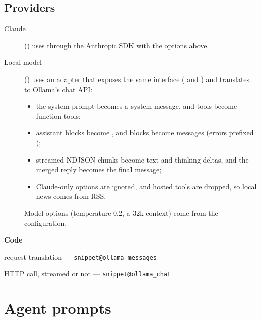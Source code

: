 \documentclass[11pt,a4paper]{article}
\makeatletter
\newcommand{\snippetsource}[1]{\csname snippet@#1\endcsname}
\newcommand{\snippet}[3]{%
  }
\newenvironment{codepointers}{%
  \par\smallskip\begingroup\footnotesize\noindent\textcolor{blue!50!black}{\textbf{Code}}\par\nopagebreak
  \begin{list}{}{\setlength{\leftmargin}{1.2em}\setlength{\itemsep}{0pt}\setlength{\parsep}{0pt}\setlength{\topsep}{1pt}}}%
  {\end{list}\endgroup\smallskip}
\newcommand{\codeitem}[2]{\item #2 --- \texttt{\snippetsource{#1}}}
\makeatother
\begin{document}
\subsection{Providers}
\begin{description}
  \item[Claude] () uses  through the
        Anthropic SDK with the options above.
  \item[Local model] () uses an adapter that exposes the same
        interface ( and ) and translates to
        Ollama's chat API:
        \begin{itemize}
          \item the system prompt becomes a system message, and tools become function tools;
          \item assistant  blocks become , and
                 blocks become  messages (errors prefixed
                );
          \item streamed NDJSON chunks become text and thinking deltas, and the merged
                reply becomes the final message;
          \item Claude-only options are ignored, and hosted tools are dropped, so local
                news comes from RSS.
        \end{itemize}
        Model options (temperature 0.2, a 32k context) come from the configuration.
\end{description}
\snippet{ollama_stream}{Python}{Ollama streaming as Anthropic-style events}
\snippet{ollama_response}{Python}{Ollama replies translated to content blocks}
\begin{codepointers}
  \codeitem{ollama_messages}{request translation}
  \codeitem{ollama_chat}{HTTP call, streamed or not}
\end{codepointers}

\section{Agent prompts}\label{sec:prompts}
\end{document}
